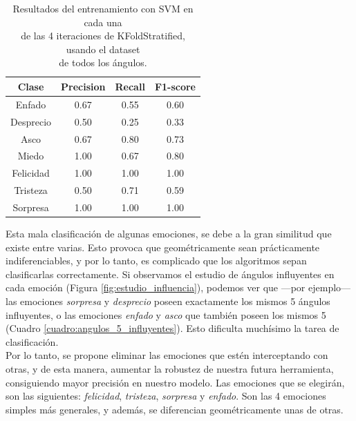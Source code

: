 \begin{table}
\begin{minipage}{0.48\linewidth}
\begin{adjustbox}{max width=\textwidth}
\begin{tabular}{|c|c|c|c|}
\hline
\textbf{Clase} & \textbf{Precision} & \textbf{Recall} & \textbf{F1-score}\\
\hline
     Enfado & 0.67 & 0.55 & 0.60\\
     Desprecio & 0.50 & 0.25 & 0.33\\
     Asco & 0.67 & 0.80 & 0.73\\
     Miedo & 1.00 & 0.67 & 0.80\\
     Felicidad & 1.00 & 1.00 & 1.00\\
     Tristeza & 0.50 & 0.71 & 0.59\\
     Sorpresa & 1.00 & 1.00 & 1.00\\
\hline
\end{tabular}
\end{adjustbox}
\end{minipage}
\captionsetup{justification=centering}
\caption{Resultados del entrenamiento con SVM en cada una\\
de las 4 iteraciones de KFoldStratified, usando el dataset\\
de todos los ángulos.}
\label{cuadro:resultados_SVM}
\end{table}

Esta mala clasificación de algunas emociones, se debe a la gran similitud que existe entre varias. Esto provoca que geométricamente sean prácticamente indiferenciables, y por lo tanto, es complicado que los algoritmos sepan clasificarlas correctamente. Si observamos el estudio de ángulos influyentes en cada emoción (Figura \ref{fig:estudio_influencia}), podemos ver que ---por ejemplo--- las emociones \textit{sorpresa} y \textit{desprecio} poseen exactamente los mismos 5 ángulos influyentes, o las emociones \textit{enfado} y \textit{asco} que también poseen los mismos 5 (Cuadro \ref{cuadro:angulos_5_influyentes}). Esto dificulta muchísimo la tarea de clasificación.\\

Por lo tanto, se propone eliminar las emociones que estén interceptando con otras, y de esta manera, aumentar la robustez de nuestra futura herramienta, consiguiendo mayor precisión en nuestro modelo. Las emociones que se elegirán, son las siguientes: \textit{felicidad}, \textit{tristeza}, \textit{sorpresa} y \textit{enfado}. Son las 4 emociones simples más generales, y además, se diferencian geométricamente unas de otras.\\

